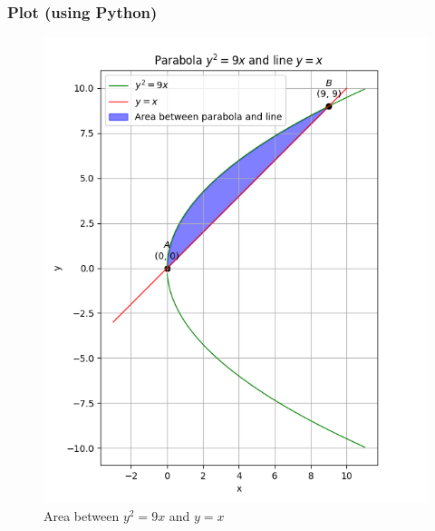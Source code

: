 \documentclass{beamer}
\theoremstyle{remark}
\numberwithin{equation}{section}
\begin{document}
\begin{frame}
  \frametitle{Plot (using Python)}
  \begin{figure}[htbp]
    \centering
    \includegraphics[width=0.5\framewidth]{figs/fig.png}
    \caption{Area between $y^2 = 9x$ and $y=x$}
  \end{figure}
\end{frame}
\end{document}
